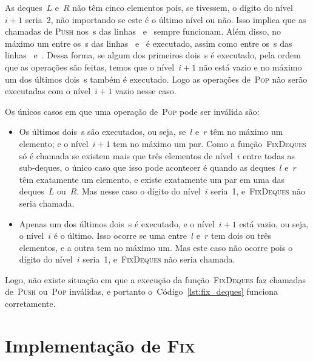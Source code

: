 \documentclass[main.tex]{subfiles}
\begin{document}
As deques~$L$ e~$R$ não têm cinco elementos pois, se tivessem, o dígito do nível~$i+1$ seria~2, não importando se este é o último nível ou não. Isso implica que as chamadas de \textsc{Push} nos~s das linhas~ e~ sempre funcionam. Além disso, no máximo um entre os~s das linhas~ e~ é executado, assim como entre os~s das linhas~ e~. Dessa forma, se algum dos primeiros dois~s é executado, pela ordem que as operações são feitas, temos que o nível~$i+1$ não está vazio e no máximo um dos últimos dois~s também é executado. Logo as operações de~\textsc{Pop} não serão executadas com o nível~$i+1$ vazio nesse caso.

Os únicos casos em que uma operação de~\textsc{Pop} pode ser inválida são:
\begin{itemize}
    \item Os últimos dois~s são executados, ou seja, se~$l$ e~$r$ têm no máximo um elemento; e o nível~$i+1$ tem no máximo um par. Como a função~\textsc{FixDeques} só é chamada se existem mais que três elementos de nível~$i$ entre todas as sub-deques, o único caso que isso pode acontecer é quando as deques~$l$ e~$r$ têm exatamente um elemento, e existe exatamente um par em uma das deques~$L$ ou~$R$. Mas nesse caso o dígito do nível~$i$ seria~1, e~\textsc{FixDeques} não seria chamada.
    \item Apenas um dos últimos dois~s é executado, e o nível~$i+1$ está vazio, ou seja, o nível~$i$ é o último. Isso ocorre se uma entre~$l$ e~$r$ tem dois ou três elementos, e a outra tem no máximo um. Mas este caso não ocorre pois o dígito do nível~$i$ seria~1, e~\textsc{FixDeques} não seria chamada.
\end{itemize}

Logo, não existe situação em que a execução da função~\textsc{FixDeques} faz chamadas de~\textsc{Push} ou~\textsc{Pop} inválidas, e portanto o~Código~\ref{lst:fix_deques} funciona corretamente.

\section{Implementação de {\normalfont \textsc{Fix}}}
\end{document}
